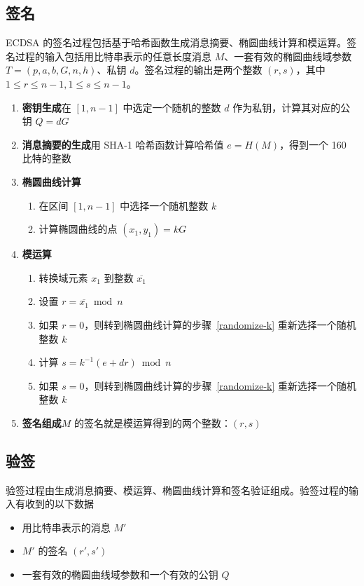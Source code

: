 \documentclass[a4paper,10pt]{article}
\begin{document}
\subsection{签名}
ECDSA 的签名过程包括基于哈希函数生成消息摘要、椭圆曲线计算和模运算。签名过程的输入包括用比特串表示的任意长度消息 \(M\)、一套有效的椭圆曲线域参数 
\(T=(p,a,b,G,n,h)\)、私钥 \(d\)。签名过程的输出是两个整数 \((r,s)\)，其中 \(1\le r\le n-1, 1\le s\le n-1\)。

\begin{enumerate}
  \item \textbf{密钥生成}\quad 在 \([1,n-1]\) 中选定一个随机的整数 \(d\) 作为私钥，计算其对应的公钥 \(Q=dG\)
  \item \textbf{消息摘要的生成}\quad 用 SHA-1 哈希函数计算哈希值 \(e=H(M)\)，得到一个 160 比特的整数
  \item \textbf{椭圆曲线计算}
    \begin{enumerate}
      \item\label{randomize-k} 在区间 \([1,n-1]\) 中选择一个随机整数 \(k\)
      \item 计算椭圆曲线的点 \((x_1,y_1)=kG\)
    \end{enumerate}
  \item \textbf{模运算}
    \begin{enumerate}
      \item 转换域元素 \(x_1\) 到整数 \(\overline{x_1}\)
      \item 设置 \(r=\overline{x_1} \bmod n\) 
      \item 如果 \(r=0\)，则转到椭圆曲线计算的步骤~\ref{randomize-k} 重新选择一个随机整数 \(k\)
      \item 计算 \(s=k^{-1}(e+dr)\bmod n\)
      \item 如果 \(s=0\)，则转到椭圆曲线计算的步骤~\ref{randomize-k} 重新选择一个随机整数 \(k\)
    \end{enumerate}
  \item \textbf{签名组成}\quad \(M\) 的签名就是模运算得到的两个整数：\((r,s)\)
\end{enumerate}

\subsection{验签}
验签过程由生成消息摘要、模运算、椭圆曲线计算和签名验证组成。验签过程的输入有收到的以下数据
\begin{itemize}
  \item 用比特串表示的消息 \(M'\)
  \item \(M'\) 的签名 \((r',s')\)
  \item 一套有效的椭圆曲线域参数和一个有效的公钥 \(Q\)
\end{itemize}
\end{document}
